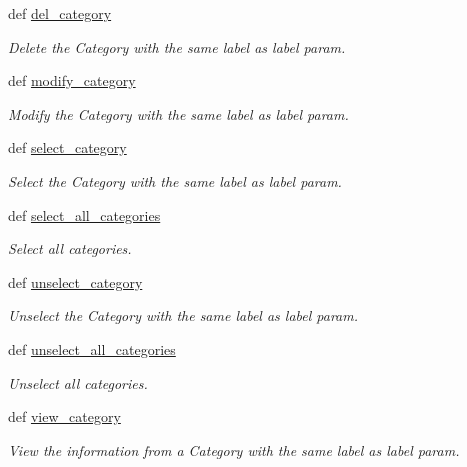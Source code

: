 \begin{CompactItemize}
def \hyperlink{classwinsol_1_1WinSOL_d9aaa8e185bf623559e556ae91f9dfb6}{del\_\-category}
\begin{CompactList}\small\item\em Delete the Category with the same label as {\em label\/} param. \item\end{CompactList}\item 
def \hyperlink{classwinsol_1_1WinSOL_a8a75759c68ca83bf3480a4892294c5a}{modify\_\-category}
\begin{CompactList}\small\item\em Modify the Category with the same label as {\em label\/} param. \item\end{CompactList}\item 
def \hyperlink{classwinsol_1_1WinSOL_52c8f729a96376d31040770bb6f870b4}{select\_\-category}
\begin{CompactList}\small\item\em Select the Category with the same label as {\em label\/} param. \item\end{CompactList}\item 
def \hyperlink{classwinsol_1_1WinSOL_0cdd751cd80ab94b10199b19e11a1b80}{select\_\-all\_\-categories}
\begin{CompactList}\small\item\em Select all categories. \item\end{CompactList}\item 
def \hyperlink{classwinsol_1_1WinSOL_102594d43dfff1afc4485b26b35c818b}{unselect\_\-category}
\begin{CompactList}\small\item\em Unselect the Category with the same label as {\em label\/} param. \item\end{CompactList}\item 
def \hyperlink{classwinsol_1_1WinSOL_7a85278fbfa4eaa1ce220a623ad80f4e}{unselect\_\-all\_\-categories}
\begin{CompactList}\small\item\em Unselect all categories. \item\end{CompactList}\item 
def \hyperlink{classwinsol_1_1WinSOL_f0e8c6905304639fba8b8267d73b1b49}{view\_\-category}
\begin{CompactList}\small\item\em View the information from a Category with the same label as {\em label\/} param. \item\end{CompactList}\item 

\end{CompactItemize}
